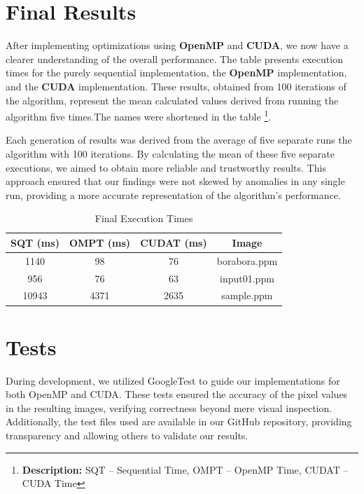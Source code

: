 \documentclass[sigconf]{acmart}
\begin{document}
\section{Final Results}
After implementing optimizations using \textbf{OpenMP} and \textbf{CUDA}, we now have a clearer understanding of the overall performance. The table presents execution times for the purely sequential implementation, the \textbf{OpenMP} implementation, and the \textbf{CUDA} implementation. These results, obtained from 100 iterations of the algorithm, represent the mean calculated values derived from running the algorithm five times.The names were shortened in the table \footnote{\textbf{Description:} SQT -- Sequential Time, OMPT -- OpenMP Time, CUDAT -- CUDA Time}.

Each generation of results was derived from the average of five separate runs the algorithm with 100 iterations. By calculating the mean of these five separate executions, we aimed to obtain more reliable and trustworthy results. This approach ensured that our findings were not skewed by anomalies in any single run, providing a more accurate representation of the algorithm's performance.

\begin{table}[h!]
\centering
\begin{tabular}{|c|c|c|c|}
\hline
\textbf{SQT (ms)} & \textbf{OMPT (ms)} & \textbf{CUDAT (ms)} & \textbf{Image} \\
\hline
1140 & 98 & 76 & borabora.ppm \\
\hline
956 & 76 & 63 & input01.ppm \\
\hline
10943 & 4371 & 2635 & sample.ppm \\
\hline
\end{tabular}
\vspace{0.2cm} %
\caption{Final Execution Times}
\label{table:staticanddynamic}
\end{table}

\section{Tests}
During development, we utilized GoogleTest to guide our implementations for both OpenMP and CUDA. These tests ensured the accuracy of the pixel values in the resulting images, verifying correctness beyond mere visual inspection. Additionally, the test files used are available in our GitHub repository, providing transparency and allowing others to validate our results.
\end{document}
